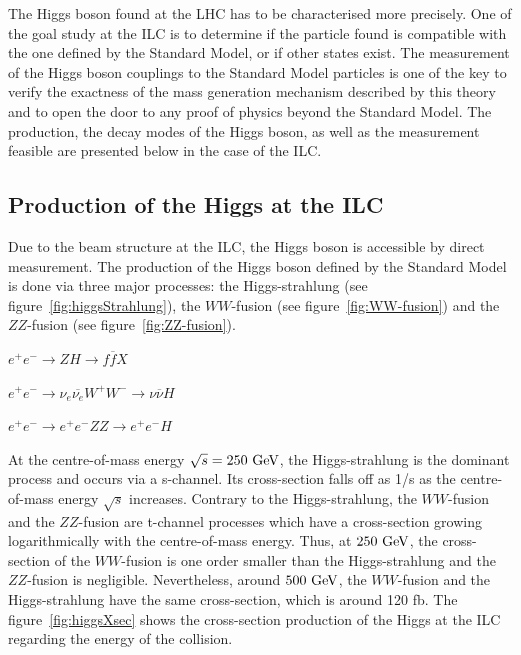   The Higgs boson found at the \gls{LHC} has to be characterised more precisely.
  One of the goal study at the \gls{ILC} is to determine if the particle found is compatible with the one defined by the Standard Model, or if other states exist.
  The measurement of the Higgs boson couplings to the Standard Model particles is one of the key to verify the exactness of the mass generation mechanism described by this theory and to open the door to any proof of physics beyond the Standard Model.
  The production, the decay modes of the Higgs boson, as well as the measurement feasible are presented below in the case of the \gls{ILC}.

    \subsection{Production of the Higgs at the ILC}

    Due to the beam structure at the \gls{ILC}, the Higgs boson is accessible by direct measurement.
    The production of the Higgs boson defined by the Standard Model is done via three major processes: the Higgs-strahlung (see figure~\ref{fig:higgsStrahlung}), the $WW$-fusion (see figure~\ref{fig:WW-fusion}) and the $ZZ$-fusion (see figure~\ref{fig:ZZ-fusion}).

    \begin{description}
      \centering
      \item[Higgs-strahlung:] $e^+e^- \rightarrow ZH \rightarrow f\overline{f}X$
      \item[$WW$-fusion:] $e^+e^- \rightarrow \nu_{e} \overline{\nu_{e}} W^+W^- \rightarrow \nu \overline{\nu} H$
      \item[$ZZ$-fusion:] $e^+e^- \rightarrow e^+e^- ZZ \rightarrow e^+e^- H$
    \end{description}


    At the centre-of-mass energy $\sqrt{s} = 250~\rm{GeV}$, the Higgs-strahlung is the dominant process and occurs via a s-channel. 
    Its cross-section falls off as 1/s as the centre-of-mass energy $\sqrt{s}$ increases.
    Contrary to the Higgs-strahlung, the $WW$-fusion and the $ZZ$-fusion are t-channel processes which have a cross-section growing logarithmically with the centre-of-mass energy.
    Thus, at $250~\rm{GeV}$, the cross-section of the $WW$-fusion is one order smaller than the Higgs-strahlung and the $ZZ$-fusion is negligible.
    Nevertheless, around $500~\rm{GeV}$, the $WW$-fusion and the Higgs-strahlung have the same cross-section, which is around 120 fb.
    The figure~\ref{fig:higgsXsec} shows the cross-section production of the Higgs at the ILC regarding the energy of the collision.
    

